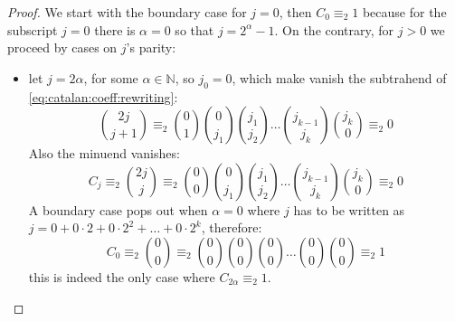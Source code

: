 \begin{proof}
We start with the boundary case for $j=0$, then $C_{0} \equiv_{2} 1$ because for the subscript $j=0$
there is $\alpha=0$ so that $j = 2^{\alpha}-1$. On the contrary, for $j>0$ %
we proceed by cases on $j$'s parity:
\begin{itemize}
    \item let $j=2\alpha$, for some $\alpha\in\mathbb{N}$, so $j_{0}=0$,
        which make vanish the subtrahend of \autoref{eq:catalan:coeff:rewriting}:
        \begin{displaymath}
            {{2j}\choose{j+1}}
            \equiv_{2} {{0}\choose{1}}{{0}\choose{j_{1}}}{{j_{1}}\choose{j_{2}}}
                \ldots{{j_{k-1}}\choose{j_{k}}}{{j_{k}}\choose{0}}\equiv_{2}0
        \end{displaymath}
        Also the minuend vanishes:
        \begin{displaymath}
            C_{j}\equiv_{2}{{2j}\choose{j}}
            \equiv_{2} {{0}\choose{0}}{{0}\choose{j_{1}}}{{j_{1}}\choose{j_{2}}}
                \ldots{{j_{k-1}}\choose{j_{k}}}{{j_{k}}\choose{0}}\equiv_{2}0
        \end{displaymath}
        A boundary case pops out when $\alpha=0$ where $j$ has to be written as
        $j=0 + 0\cdot2 + 0\cdot2^{2} + \ldots + 0\cdot2^{k}$, therefore:
        \begin{displaymath}
            C_{0}\equiv_{2}{{0}\choose{0}}
            \equiv_{2} {{0}\choose{0}}{{0}\choose{0}}{{0}\choose{0}}
                \ldots{{0}\choose{0}}{{0}\choose{0}}\equiv_{2}1
        \end{displaymath}
        this is indeed the only case where $C_{2\alpha} \equiv_{2}1$.
        \iffalse
        \begin{proof}
            Assume not, hence there exists $\hat{\alpha}\in\mathbb{N}$, greater than $0$,
            such that $C_{2\hat{\alpha}} \equiv_{2}1$. So for ${{0}\choose{j_{1}}}$
            be not zero then $j_{1}=0$; in turn, this constraint requires a new one, namely
            for ${{0}\choose{j_{2}}}$ be not zero then $j_{2}=0$;
            in turn, this constraint requires a new one, namely
            for ${{0}\choose{j_{3}}}$ be not zero then $j_{3}=0$;
            in turn, this constraint requires a new one, namely\ldots
            for ${{0}\choose{j_{k}}}$ be not zero then $j_{k}=0$.
            Therefore $j=0$, which contradicts the hypothesis $\alpha>0$. So,
            for even $j > 0$, coefficient $C_{j}\equiv_{2}0$, as required.
        \end{proof}
        \fi


\end{itemize}
\end{proof}
